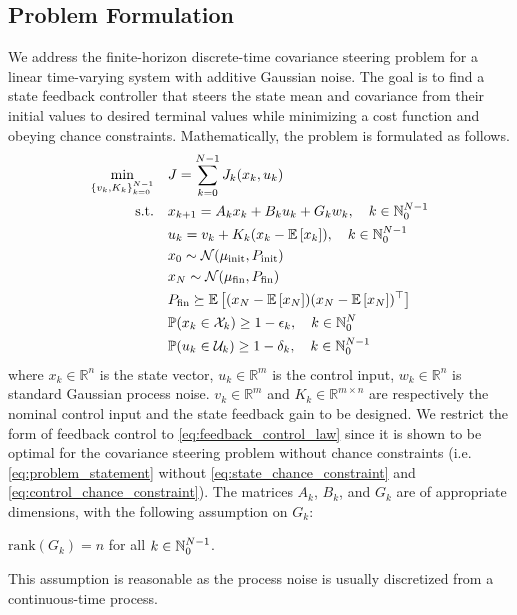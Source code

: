 \documentclass{IEEEtran}
\begin{document}
\subsection{Problem Formulation}
We address the finite-horizon discrete-time covariance steering problem for a linear time-varying system with additive Gaussian noise. The goal is to find a state feedback controller that steers the state mean and covariance from their initial values to desired terminal values while minimizing a cost function and obeying chance constraints. Mathematically, the problem is formulated as follows.
\begin{subequations}
\label{eq:problem_statement}
\begin{align}
	\min_{\{v_k, K_k\}_{k=0}^{N-1}} \quad & J = \sum_{k=0}^{N-1} J_k (x_k, u_k) \\
	\text{s.t.} \quad & x_{k+1} = A_k x_k + B_k u_k + G_k w_k, \quad k \in \mathbb{N}_{0}^{N-1} \\
	& u_k = v_k + K_k (x_k - \mathbb{E}\left[x_k\right]), \quad k \in \mathbb{N}_{0}^{N-1} \label{eq:feedback_control_law}\\
	& x_0 \sim \mathcal{N}(\mu_{\mathrm{init}}, P_{\mathrm{init}}) \\
	& x_N \sim \mathcal{N}(\mu_{\mathrm{fin}}, P_{\mathrm{fin}}) \\
	& P_{\mathrm{fin}} \succeq \mathbb{E}\left[(x_N - \mathbb{E}\left[x_N\right])(x_N - \mathbb{E}\left[x_N\right])^\top\right] \\
	& \mathbb{P}(x_k \in \mathcal{X}_k) \geq 1 - \epsilon_k, \quad k \in \mathbb{N}_{0}^{N} \label{eq:state_chance_constraint}\\ 
	& \mathbb{P}(u_k \in \mathcal{U}_k) \geq 1 - \delta_k, \quad k \in \mathbb{N}_{0}^{N-1} \label{eq:control_chance_constraint}
\end{align}
\end{subequations}
where \( x_k \in \mathbb{R}^n \) is the state vector, \( u_k \in \mathbb{R}^m \) is the control input, \( w_k \in \mathbb{R}^n \) is standard Gaussian process noise. \( v_k \in \mathbb{R}^m \) and \( K_k \in \mathbb{R}^{m \times n} \) are respectively the nominal control input and the state feedback gain to be designed. We restrict the form of feedback control to \cref{eq:feedback_control_law} since it is shown to be optimal for the covariance steering problem without chance constraints \cite{liuOptimalCovarianceSteering2025} (i.e. \cref{eq:problem_statement} without \cref{eq:state_chance_constraint} and \cref{eq:control_chance_constraint}). The matrices \( A_k \), \( B_k \), and \( G_k \) are of appropriate dimensions, with the following assumption on \(G_k\):
\begin{assumption} \label{assump:full_rank_G}
	\( \mathrm{rank}(G_k) = n \) for all \( k \in \mathbb{N}_{0}^{N-1} \).
\end{assumption}
This assumption is reasonable as the process noise is usually discretized from a continuous-time process. 
\end{document}
